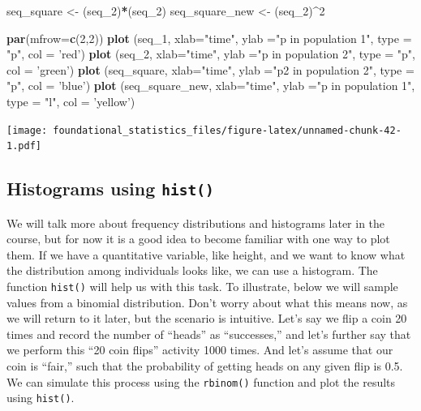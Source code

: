 \documentclass[]{book}
\newenvironment{Shaded}{\begin{snugshade}}{\end{snugshade}}
\newcommand{\DataTypeTok}[1]{\textcolor[rgb]{0.13,0.29,0.53}{#1}}
\newcommand{\DecValTok}[1]{\textcolor[rgb]{0.00,0.00,0.81}{#1}}
\newcommand{\KeywordTok}[1]{\textcolor[rgb]{0.13,0.29,0.53}{\textbf{#1}}}
\newcommand{\NormalTok}[1]{#1}
\newcommand{\OperatorTok}[1]{\textcolor[rgb]{0.81,0.36,0.00}{\textbf{#1}}}
\newcommand{\StringTok}[1]{\textcolor[rgb]{0.31,0.60,0.02}{#1}}
\begin{document}
\begin{Shaded}
\begin{Highlighting}[]
\NormalTok{seq_square <-}\StringTok{ }\NormalTok{(seq_}\DecValTok{2}\NormalTok{)}\OperatorTok{*}\NormalTok{(seq_}\DecValTok{2}\NormalTok{)}
\NormalTok{seq_square_new <-}\StringTok{ }\NormalTok{(seq_}\DecValTok{2}\NormalTok{)}\OperatorTok{^}\DecValTok{2}

\KeywordTok{par}\NormalTok{(}\DataTypeTok{mfrow=}\KeywordTok{c}\NormalTok{(}\DecValTok{2}\NormalTok{,}\DecValTok{2}\NormalTok{))}
\KeywordTok{plot}\NormalTok{ (seq_}\DecValTok{1}\NormalTok{, }\DataTypeTok{xlab=}\StringTok{"time"}\NormalTok{, }\DataTypeTok{ylab =}\StringTok{"p in population 1"}\NormalTok{, }\DataTypeTok{type =} \StringTok{"p"}\NormalTok{, }\DataTypeTok{col =} \StringTok{'red'}\NormalTok{)}
\KeywordTok{plot}\NormalTok{ (seq_}\DecValTok{2}\NormalTok{, }\DataTypeTok{xlab=}\StringTok{"time"}\NormalTok{, }\DataTypeTok{ylab =}\StringTok{"p in population 2"}\NormalTok{, }\DataTypeTok{type =} \StringTok{"p"}\NormalTok{, }\DataTypeTok{col =} \StringTok{'green'}\NormalTok{)}
\KeywordTok{plot}\NormalTok{ (seq_square, }\DataTypeTok{xlab=}\StringTok{"time"}\NormalTok{, }\DataTypeTok{ylab =}\StringTok{"p2 in population 2"}\NormalTok{, }\DataTypeTok{type =} \StringTok{"p"}\NormalTok{, }\DataTypeTok{col =} \StringTok{'blue'}\NormalTok{)}
\KeywordTok{plot}\NormalTok{ (seq_square_new, }\DataTypeTok{xlab=}\StringTok{"time"}\NormalTok{, }\DataTypeTok{ylab =}\StringTok{"p in population 1"}\NormalTok{, }\DataTypeTok{type =} \StringTok{"l"}\NormalTok{, }\DataTypeTok{col =} \StringTok{'yellow'}\NormalTok{)}
\end{Highlighting}
\end{Shaded}

\texttt{[image: foundational\_statistics\_files/figure-latex/unnamed-chunk-42-1.pdf]}

\hypertarget{histograms-using-hist}{%
\subsection{\texorpdfstring{Histograms using \texttt{hist()}}{Histograms using hist()}}\label{histograms-using-hist}}

We will talk more about frequency distributions and histograms later in the course, but for now it is a good idea to become familiar with one way to plot them. If we have a quantitative variable, like height, and we want to know what the distribution among individuals looks like, we can use a histogram. The function \texttt{hist()} will help us with this task. To illustrate, below we will sample values from a binomial distribution. Don't worry about what this means now, as we will return to it later, but the scenario is intuitive. Let's say we flip a coin 20 times and record the number of ``heads'' as ``successes,'' and let's further say that we perform this ``20 coin flips'' activity 1000 times. And let's assume that our coin is ``fair,'' such that the probability of getting heads on any given flip is 0.5. We can simulate this process using the \texttt{rbinom()} function and plot the results using \texttt{hist()}.
\end{document}
